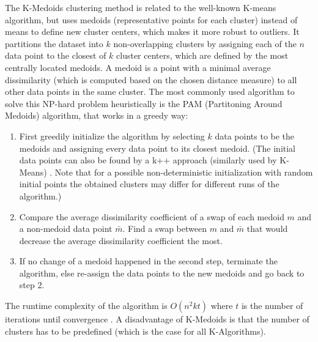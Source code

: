 
The K-Medoids clustering method is related to the well-known K-means algorithm, but uses medoids (representative points for each cluster) instead of means to define new cluster centers, which makes it more robust to outliers\cite{Jin2010}. It partitions the dataset into $k$ non-overlapping clusters by assigning each of the $n$ data point to the closest of $k$ cluster centers, which are defined by the most centrally located medoids. A medoid is a point with a minimal average dissimilarity (which is computed based on the chosen distance measure) to all other data points in the same cluster. The most commonly used algorithm to solve this NP-hard problem heuristically is the PAM (Partitoning Around Medoids) algorithm, that works in a greedy way: \cite{kaufman2009finding} \\
\begin{enumerate}
	\item First greedily initialize the algorithm by selecting $k$ data points to be the medoids and assigning every data point to its closest medoid. (The initial data points can also be found by a k++ approach (similarly used by K-Means) \cite{scikit-learn-extra}. Note that for a possible  non-deterministic initialization with random initial points the obtained clusters may differ for different runs of the algorithm.) \\
	\item Compare the average dissimilarity coefficient of a swap of each medoid $m$ and a non-medoid data point $\bar{m}$. Find a swap between $m$ and $\bar{m}$ that would decrease the average dissimilarity coefficient the most. 
	\item If no change of a medoid happened in the second step, terminate the algorithm, else re-assign the data points to the new medoids and go back to step 2. 
\end{enumerate}

The runtime complexity of the algorithm is $O(n^2kt)$ where $t$ is the number of iterations until convergence  \cite{scikit-learn-extra}. A disadvantage of K-Medoids is that the number of clusters has to be predefined (which is the case for all K-Algorithms). 